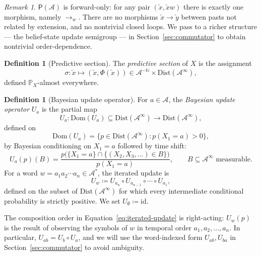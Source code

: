 \documentclass[11pt,a4paper]{article}
\theoremstyle{plain}
\theoremstyle{definition}
\newtheorem{definition}[theorem]{Definition}
\theoremstyle{remark}
\newtheorem{remark}[theorem]{Remark}
\newcommand{\Dist}{\mathrm{Dist}}
\newcommand{\Prob}{\mathbb{P}}
\newcommand{\eqdef}{\coloneqq}
\newcommand{\PathCat}{\mathsf{P}}
\newcommand{\Alphabet}{\mathcal{A}}
\newcommand{\Dom}{\mathrm{Dom}}
\newcommand{\Past}{\overleftarrow{x}}
\newcommand{\Pasts}{\Alphabet^{-\mathbb{N}}}
\begin{document}
\begin{remark}
$\PathCat(\Alphabet)$ is forward-only: for any pair $(\Past, \Past w)$ there is exactly one morphism, namely $\to_w$. There are no morphisms $\Past \to \overleftarrow{y}$ between pasts not related by extension, and no nontrivial closed loops. We pass to a richer structure --- the belief-state update semigroup --- in Section~\ref{sec:commutator} to obtain nontrivial order-dependence.
\end{remark}

\begin{definition}[Predictive section]
\label{def:section}
The \emph{predictive section} of $X$ is the assignment
\begin{equation}
    \sigma : \Past \mapsto (\Past, \Phi(\Past)) \in \Pasts \times \Dist(\Alphabet^\infty),
\end{equation}
defined $\Prob_X$-almost everywhere.
\end{definition}

\begin{definition}[Bayesian update operator]
\label{def:update}
For $a \in \Alphabet$, the \emph{Bayesian update operator} $U_a$ is the partial map
\begin{equation}
    U_a : \Dom(U_a) \subseteq \Dist(\Alphabet^\infty) \to \Dist(\Alphabet^\infty),
\end{equation}
defined on
\begin{equation}
    \Dom(U_a) = \bigl\{ p \in \Dist(\Alphabet^\infty) : p(X_1 = a) > 0 \bigr\},
\end{equation}
by Bayesian conditioning on $X_1 = a$ followed by time shift:
\begin{equation}
    U_a(p)(B) = \frac{p\bigl(\{X_1 = a\} \cap \{(X_2, X_3, \ldots) \in B\}\bigr)}{p(X_1 = a)}, \qquad B \subseteq \Alphabet^\infty \text{ measurable}.
\end{equation}
For a word $w = a_1 a_2 \cdots a_n \in \Alphabet^*$, the iterated update is
\begin{equation}
    U_w \eqdef U_{a_n} \circ U_{a_{n-1}} \circ \cdots \circ U_{a_1},
    \label{eq:iterated-update}
\end{equation}
defined on the subset of $\Dist(\Alphabet^\infty)$ for which every intermediate conditional probability is strictly positive. We set $U_\emptyset \eqdef \mathrm{id}$.
\end{definition}

The composition order in Equation~\eqref{eq:iterated-update} is right-acting: $U_w(p)$ is the result of observing the symbols of $w$ in temporal order $a_1, a_2, \ldots, a_n$. In particular, $U_{ab} = U_b \circ U_a$, and we will use the word-indexed form $U_{ab}, U_{ba}$ in Section~\ref{sec:commutator} to avoid ambiguity.
\end{document}

